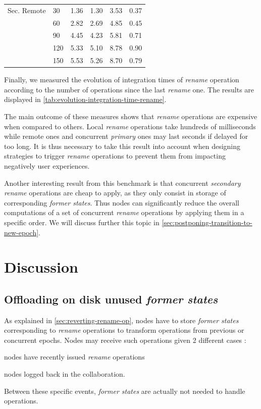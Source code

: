 \documentclass[10pt,journal,compsoc]{IEEEtran}
\begin{document}
\begin{table}[t!]
{\begin{tabular}{llrrrr}
            Sec. Remote & 30  &     1.36 &     1.30 &       3.53 &   0.37 \\
                                    & 60  &     2.82 &     2.69 &       4.85 &   0.45 \\
                                    & 90  &     4.45 &     4.23 &       5.81 &   0.71 \\
                                    & 120 &     5.33 &     5.10 &       8.78 &   0.90 \\
                                    & 150 &     5.53 &     5.26 &       8.70 &   0.79 \\
            \bottomrule
        \end{tabular}
    }
\end{table}

Finally, we measured the evolution of integration times of \emph{rename} operation according to the number of operations since the last \emph{rename} one.
The results are displayed in \autoref{tab:evolution-integration-time-rename}.

The main outcome of these measures shows that \emph{rename} operations are expensive when compared to others.
Local \emph{rename} operations take hundreds of milliseconds while remote ones and concurrent \emph{primary} ones may last seconds if delayed for too long.
It is thus necessary to take this result into account when designing strategies to trigger \emph{rename} operations to prevent them from impacting negatively user experiences.

Another interesting result from this benchmark is that concurrent \emph{secondary rename} operations are cheap to apply, as they only consist in storage of corresponding \emph{former states}.
Thus nodes can significantly reduce the overall computations of a set of concurrent \emph{rename} operations by applying them in a specific order.
We will discuss further this topic in \autoref{sec:postponing-transition-to-new-epoch}.

\section{Discussion}

\subsection{Offloading on disk unused \emph{former states}}
\label{sec:offloading-former-states}

As explained in \autoref{sec:reverting-rename-op}, nodes have to store \emph{former states} corresponding to \emph{rename} operations to transform operations from previous or concurrent epochs.
Nodes may receive such operations given 2 different cases :
\begin{enumerate*}[label=(\roman*)]
    \item nodes have recently issued \emph{rename} operations
    \item nodes logged back in the collaboration.
\end{enumerate*}
Between these specific events, \emph{former states} are actually not needed to handle operations.
\end{document}

